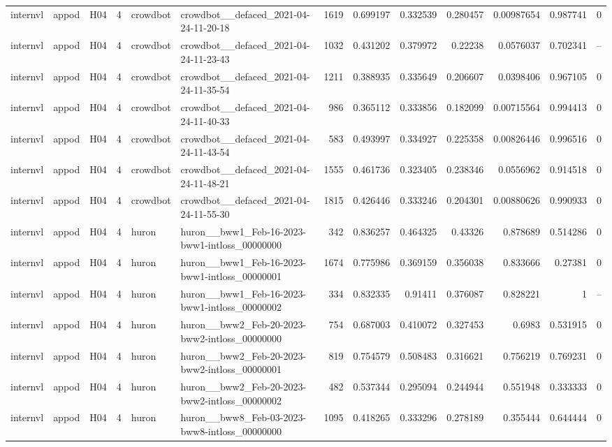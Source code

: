 \begin{longtable}{lllrllrrrrrrr}
internvl & appod & H04 & 4 & crowdbot & crowdbot\_\_defaced\_2021-04-24-11-20-18 & 1619 & 0.699197 & 0.332539 & 0.280457 & 0.00987654 & 0.987741 & 0 \\
internvl & appod & H04 & 4 & crowdbot & crowdbot\_\_defaced\_2021-04-24-11-23-43 & 1032 & 0.431202 & 0.379972 & 0.22238 & 0.0576037 & 0.702341 & -- \\
internvl & appod & H04 & 4 & crowdbot & crowdbot\_\_defaced\_2021-04-24-11-35-54 & 1211 & 0.388935 & 0.335649 & 0.206607 & 0.0398406 & 0.967105 & 0 \\
internvl & appod & H04 & 4 & crowdbot & crowdbot\_\_defaced\_2021-04-24-11-40-33 & 986 & 0.365112 & 0.333856 & 0.182099 & 0.00715564 & 0.994413 & 0 \\
internvl & appod & H04 & 4 & crowdbot & crowdbot\_\_defaced\_2021-04-24-11-43-54 & 583 & 0.493997 & 0.334927 & 0.225358 & 0.00826446 & 0.996516 & 0 \\
internvl & appod & H04 & 4 & crowdbot & crowdbot\_\_defaced\_2021-04-24-11-48-21 & 1555 & 0.461736 & 0.323405 & 0.238346 & 0.0556962 & 0.914518 & 0 \\
internvl & appod & H04 & 4 & crowdbot & crowdbot\_\_defaced\_2021-04-24-11-55-30 & 1815 & 0.426446 & 0.333246 & 0.204301 & 0.00880626 & 0.990933 & 0 \\
internvl & appod & H04 & 4 & huron & huron\_\_bww1\_Feb-16-2023-bww1-intloss\_00000000 & 342 & 0.836257 & 0.464325 & 0.43326 & 0.878689 & 0.514286 & 0 \\
internvl & appod & H04 & 4 & huron & huron\_\_bww1\_Feb-16-2023-bww1-intloss\_00000001 & 1674 & 0.775986 & 0.369159 & 0.356038 & 0.833666 & 0.27381 & 0 \\
internvl & appod & H04 & 4 & huron & huron\_\_bww1\_Feb-16-2023-bww1-intloss\_00000002 & 334 & 0.832335 & 0.91411 & 0.376087 & 0.828221 & 1 & -- \\
internvl & appod & H04 & 4 & huron & huron\_\_bww2\_Feb-20-2023-bww2-intloss\_00000000 & 754 & 0.687003 & 0.410072 & 0.327453 & 0.6983 & 0.531915 & 0 \\
internvl & appod & H04 & 4 & huron & huron\_\_bww2\_Feb-20-2023-bww2-intloss\_00000001 & 819 & 0.754579 & 0.508483 & 0.316621 & 0.756219 & 0.769231 & 0 \\
internvl & appod & H04 & 4 & huron & huron\_\_bww2\_Feb-20-2023-bww2-intloss\_00000002 & 482 & 0.537344 & 0.295094 & 0.244944 & 0.551948 & 0.333333 & 0 \\
internvl & appod & H04 & 4 & huron & huron\_\_bww8\_Feb-03-2023-bww8-intloss\_00000000 & 1095 & 0.418265 & 0.333296 & 0.278189 & 0.355444 & 0.644444 & 0 \\

\end{longtable}
